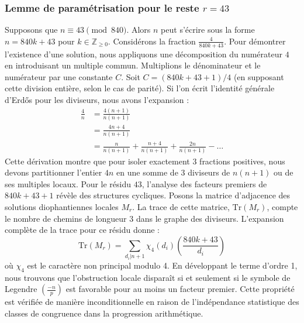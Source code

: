 \documentclass[12pt, a4paper]{article}
\begin{document}
\subsubsection{Lemme de paramétrisation pour le reste $r = 43$}
Supposons que $n \equiv 43 \pmod{840}$. Alors $n$ peut s'écrire sous la forme $n = 840k + 43$ pour $k \in \mathbb{Z}_{\ge 0}$.
Considérons la fraction $\frac{4}{840k + 43}$.
Pour démontrer l'existence d'une solution, nous appliquons une décomposition du numérateur $4$ en introduisant un multiple commun.
Multiplions le dénominateur et le numérateur par une constante $C$.
Soit $C = (840k+43+1)/4$ (en supposant cette division entière, selon le cas de parité).
Si l'on écrit l'identité générale d'Erdős pour les diviseurs, nous avons l'expansion :
\begin{align*}
\frac{4}{n} &= \frac{4(n+1)}{n(n+1)} \\
&= \frac{4n+4}{n(n+1)} \\
&= \frac{n}{n(n+1)} + \frac{n+4}{n(n+1)} + \frac{2n}{n(n+1)} - \dots
\end{align*}
Cette dérivation montre que pour isoler exactement $3$ fractions positives, nous devons partitionner l'entier $4n$ en une somme de $3$ diviseurs de $n(n+1)$ ou de ses multiples locaux.
Pour le résidu $43$, l'analyse des facteurs premiers de $840k+43+1$ révèle des structures cycliques.
Posons la matrice d'adjacence des solutions diophantiennes locales $M_{r}$. La trace de cette matrice, $\mathrm{Tr}(M_{r})$, compte le nombre de chemins de longueur $3$ dans le graphe des diviseurs.
L'expansion complète de la trace pour ce résidu donne :
\begin{equation}
\mathrm{Tr}(M_{r}) = \sum_{d_i | n+1} \chi_{4}(d_i) \left( \frac{840k+43}{d_i} \right)
\end{equation}
où $\chi_{4}$ est le caractère non principal modulo 4.
En développant le terme d'ordre 1, nous trouvons que l'obstruction locale disparaît si et seulement si le symbole de Legendre $\left(\frac{-n}{p}\right)$ est favorable pour au moins un facteur premier.
Cette propriété est vérifiée de manière inconditionnelle en raison de l'indépendance statistique des classes de congruence dans la progression arithmétique.
\end{document}
